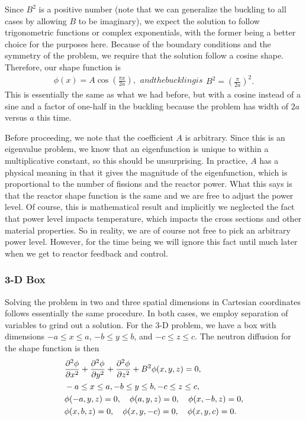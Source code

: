 Since $B^2$ is a positive number (note that we can generalize the buckling to all cases by allowing $B$ to be imaginary), we expect the solution to follow trigonometric functions or complex exponentials, with the former being a better choice for the purposes here.  Because of the boundary conditions and the symmetry of the problem, we require that the solution follow a cosine shape. Therefore, our shape function is
\begin{subequations}
\begin{align}
  \phi(x) = A \cos\left( \frac{\pi x}{2 a} \right),
\end{align}
and the buckling is
\begin{align}
  B^2 = \left( \frac{\pi}{2a} \right)^2 .
\end{align}
\end{subequations}
This is essentially the same as what we had before, but with a cosine instead of a sine and a factor of one-half in the buckling because the problem has width of $2a$ versus $a$ this time.

Before proceeding, we note that the coefficient $A$ is arbitrary. Since this is an eigenvalue problem, we know that an eigenfunction is unique to within a multiplicative constant, so this should be unsurprising. In practice, $A$ has a physical meaning in that it gives the magnitude of the eigenfunction, which is proportional to the number of fissions and the reactor power. What this says is that the reactor shape function is the same and we are free to adjust the power level. Of course, this is mathematical result and implicitly we neglected the fact that power level impacts temperature, which impacts the cross sections and other material properties. So in reality, we are of course not free to pick an arbitrary power level. However, for the time being we will ignore this fact until much later when we get to reactor feedback and control.

\subsubsection{3-D Box}

Solving the problem in two and three spatial dimensions in Cartesian coordinates follows essentially the same procedure. In both cases, we employ separation of variables to grind out a solution. For the 3-D problem, we have a box with dimensions $-a \le x \le a$, $-b \le y \le b$, and $-c \le z \le c$. The neutron diffusion for the shape function is then
\begin{subequations}
\begin{align}
  &\frac{ \partial^2 {\phi} }{ \partial {x}^2 } + \frac{ \partial^2 {\phi} }{ \partial {y}^2 } + \frac{ \partial^2 {\phi} }{ \partial {z}^2 } + B^2 \phi(x,y,z) = 0, \nonumber \\
  &-a \le x \le a, -b \le y \le b, -c \le z \le c, \\
  &\phi(-a,y,z) = 0, \quad \phi(a,y,z)  = 0, \quad \phi(x,-b,z) = 0, \nonumber \\
  &\phi(x,b,z)  = 0, \quad \phi(x,y,-c) = 0, \quad \phi(x,y,c)  = 0.
\end{align}
\end{subequations}

